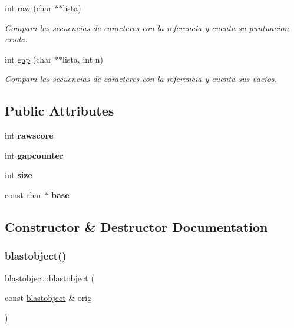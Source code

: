 \begin{DoxyCompactItemize}
int \hyperlink{classblastobject_a0426c755487823aebf8734b19e668a49}{raw} (char $\ast$$\ast$lista)
\begin{DoxyCompactList}\small\item\em Compara las secuencias de caracteres con la referencia y cuenta su puntuacion cruda. \end{DoxyCompactList}\item 
int \hyperlink{classblastobject_ae6ca5436041b743e8c20739a9f59ef91}{gap} (char $\ast$$\ast$lista, int n)
\begin{DoxyCompactList}\small\item\em Compara las secuencias de caracteres con la referencia y cuenta sus vacios. \end{DoxyCompactList}\end{DoxyCompactItemize}
\subsection*{Public Attributes}
\begin{DoxyCompactItemize}
\item 
\hypertarget{classblastobject_ad9bd5756d99478be4072818bffa2bc9e}{}\label{classblastobject_ad9bd5756d99478be4072818bffa2bc9e} 
int {\bfseries rawscore}
\item 
\hypertarget{classblastobject_afc851d8c3cf8495abf28c707e5c28fed}{}\label{classblastobject_afc851d8c3cf8495abf28c707e5c28fed} 
int {\bfseries gapcounter}
\item 
\hypertarget{classblastobject_a801149f5f021420528a7f2b593f9c7f0}{}\label{classblastobject_a801149f5f021420528a7f2b593f9c7f0} 
int {\bfseries size}
\item 
\hypertarget{classblastobject_adc4e3120d055bdd7e2ec1cb704796fdb}{}\label{classblastobject_adc4e3120d055bdd7e2ec1cb704796fdb} 
const char $\ast$ {\bfseries base}
\end{DoxyCompactItemize}


\subsection{Constructor \& Destructor Documentation}
\hypertarget{classblastobject_aa6004c11726327285515febd40f26b28}{}\label{classblastobject_aa6004c11726327285515febd40f26b28} 
\subsubsection{\texorpdfstring{blastobject()}{blastobject()}}
{\ttfamily blastobject\+::blastobject (\begin{DoxyParamCaption}\item[{const \hyperlink{classblastobject}{blastobject} \&}]{orig }\end{DoxyParamCaption})}



